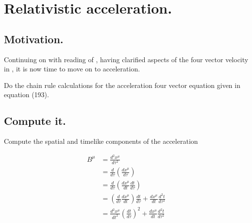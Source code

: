 
%
%




\chapter{Relativistic acceleration. }
\label{chap:accFourVector}
\date{ April 10, 2009.   accFourVector.tex }

%

\section{Motivation. }

Continuing on with reading of \citep{pauli1981tr}, having 
clarified aspects of the four vector velocity in , it is now
time to move on to acceleration.

Do the chain rule calculations for the acceleration four vector equation given in equation (193).

\section{Compute it. }

Compute the spatial and timelike components of the acceleration

\begin{align*}
B^\mu 
&= \frac{d^2 x^\mu}{d\tau^2} \\
&= \frac{d }{d\tau} \left( \frac{d x^\mu }{d\tau} \right) \\
&= \frac{d }{d\tau} \left( \frac{d x^\mu }{dt} \frac{dt}{d\tau} \right) \\
&= \left( \frac{d }{d\tau} \frac{d x^\mu }{dt} \right) \frac{dt}{d\tau} + \frac{d x^\mu }{dt} \frac{d^2t}{d\tau^2} \\
&= \frac{d^2 x^\mu }{dt^2} \left( \frac{dt}{d\tau} \right)^2 + \frac{d x^\mu }{dt} \frac{d^2t}{d\tau^2} \\
\end{align*}

